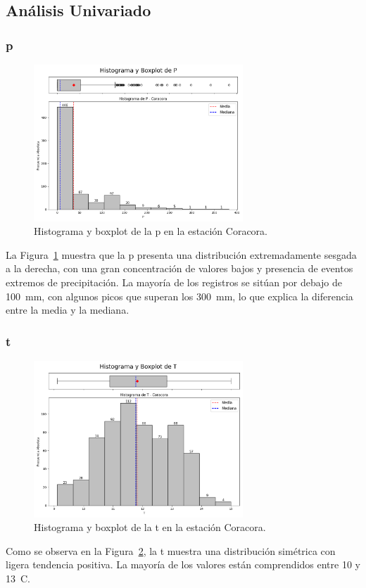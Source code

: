 \subsection{Análisis Univariado}

\subsubsection*{\gls{p} }
\begin{figure}[htbp]
\centering
\includegraphics[width=0.7\textwidth]{resultados/por_estacion_meteorologica/Coracora/P_histograma.png}
\caption{Histograma y boxplot de la \gls{p}  en la estación Coracora.}
\label{fig:coracora_P}
\end{figure}
La Figura~\ref{fig:coracora_P} muestra que la \gls{p} presenta una distribución extremadamente sesgada a la derecha, con una gran concentración de valores bajos y presencia de eventos extremos de precipitación.
La mayoría de los registros se sitúan por debajo de 100~mm, con algunos picos que superan los 300~mm, lo que explica la diferencia entre la media y la mediana.

\subsubsection*{\gls{t} }
\begin{figure}[htbp]
\centering
\includegraphics[width=0.7\textwidth]{resultados/por_estacion_meteorologica/Coracora/T_histograma.png}
\caption{Histograma y boxplot de la \gls{t}  en la estación Coracora.}
\label{fig:coracora_T}
\end{figure}
Como se observa en la Figura~\ref{fig:coracora_T}, la \gls{t} muestra una distribución simétrica con ligera tendencia positiva. La mayoría de los valores están comprendidos entre 10 y 13~\textdegree C.


